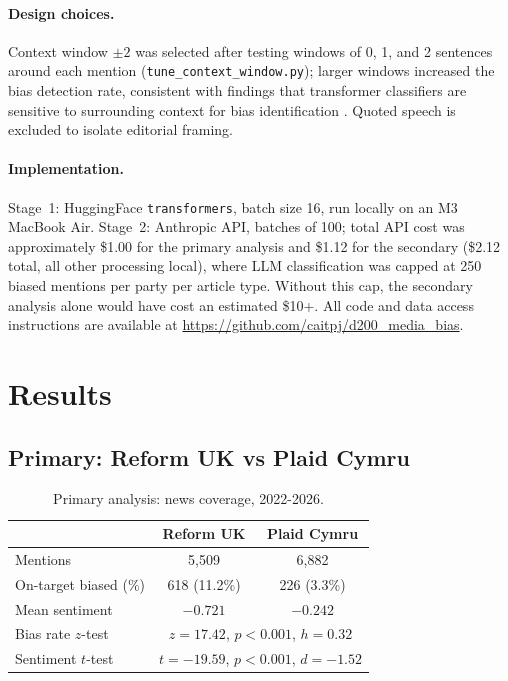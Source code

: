 \documentclass[10pt]{article}
\begin{document}
\paragraph{Design choices.} Context window $\pm 2$ was selected after testing windows of 0, 1, and 2 sentences around each mention (\texttt{tune\_context\_window.py}); larger windows increased the bias detection rate, consistent with findings that transformer classifiers are sensitive to surrounding context for bias identification \citep{spinde2021}. Quoted speech is excluded to isolate editorial framing.

\paragraph{Implementation.} Stage~1: HuggingFace \texttt{transformers}, batch size 16, run locally on an M3 MacBook Air. Stage~2: Anthropic API, batches of 100; total API cost was approximately \$1.00 for the primary analysis and \$1.12 for the secondary (\$2.12 total, all other processing local), where LLM classification was capped at 250 biased mentions per party per article type. Without this cap, the secondary analysis alone would have cost an estimated \$10+. All code and data access instructions are available at \url{https://github.com/caitpj/d200_media_bias}.

\section{Results}

\subsection{Primary: Reform UK vs Plaid Cymru}

\begin{table}[ht]
\centering\small
\begin{tabular}{lcc}
\toprule
 & \textbf{Reform UK} & \textbf{Plaid Cymru} \\
\midrule
Mentions & 5{,}509 & 6{,}882 \\
On-target biased (\%) & 618 (11.2\%) & 226 (3.3\%) \\
Mean sentiment & $-0.721$ & $-0.242$ \\
\midrule
Bias rate $z$-test & \multicolumn{2}{c}{$z = 17.42$, $p < 0.001$, $h = 0.32$} \\
Sentiment $t$-test & \multicolumn{2}{c}{$t = -19.59$, $p < 0.001$, $d = -1.52$} \\
\bottomrule
\end{tabular}
\caption{Primary analysis: news coverage, 2022-2026.}
\label{tab:primary}
\end{table}
\end{document}
